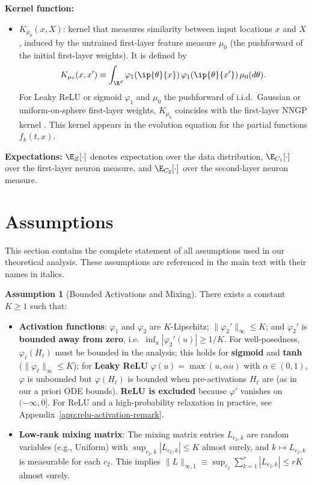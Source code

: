 \documentclass[nohyperref]{article}
\theoremstyle{plain}
\theoremstyle{definition}
\newtheorem{assumption}[theorem]{Assumption}
\theoremstyle{remark}
\begin{document}
\textbf{Kernel function:}
\begin{itemize}
\item $K_{\mu_0}(x,X)$: kernel that measures similarity between input locations $x$ and $X$, induced by the untrained first-layer feature measure $\mu_0$ (the pushforward of the initial first-layer weights). It is defined by
\[
K_{\mu_0}(x,x') \equiv \int_{\R^d}\varphi_1(\ip{\theta}{x})\,\varphi_1(\ip{\theta}{x'})\,\mu_0(d\theta).
\]
For Leaky ReLU or sigmoid $\varphi_1$ and $\mu_0$ the pushforward of i.i.d.\ Gaussian or uniform-on-sphere first-layer weights, $K_{\mu_0}$ coincides with the first-layer NNGP kernel \cite{jacot2018neural}. This kernel appears in the evolution equation for the partial functions $f_k(t,x)$.
\end{itemize}

\textbf{Expectations:} $\E_Z[\cdot]$ denotes expectation over the data distribution, $\E_{C_1}[\cdot]$ over the first-layer neuron measure, and $\E_{C_2}[\cdot]$ over the second-layer neuron measure.





\section{Assumptions}
\label{app:assumptions}

This section contains the complete statement of all assumptions used in our theoretical analysis. These assumptions are referenced in the main text with their names in italics.

\begin{assumption}[Bounded Activations and Mixing]
\label{assump:regularity}
There exists a constant $K\ge 1$ such that:
\begin{itemize}
\item \textbf{Activation functions}: $\varphi_1$ and $\varphi_2$ are $K$-Lipschitz; $\|\varphi_2'\|_\infty\le K$; and $\varphi_2'$ is \textbf{bounded away from zero}, i.e.\ $\inf_u |\varphi_2'(u)|\ge 1/K$. For well-posedness, $\varphi_\ell(H_\ell)$ must be bounded in the analysis; this holds for \textbf{sigmoid} and \textbf{tanh} ($\|\varphi_\ell\|_\infty\le K$); for \textbf{Leaky ReLU} $\varphi(u)=\max(u,\alpha u)$ with $\alpha\in(0,1)$, $\varphi$ is unbounded but $\varphi(H_\ell)$ is bounded when pre-activations $H_\ell$ are (as in our a priori ODE bounds). \textbf{ReLU is excluded} because $\varphi'$ vanishes on $(-\infty,0]$. For ReLU and a high-probability relaxation in practice, see Appendix~\ref{app:relu-activation-remark}.
\item \textbf{Low-rank mixing matrix}: The mixing matrix entries $L_{c_2,k}$ are random variables (e.g., Uniform) with $\sup_{c_2,k}|L_{c_2,k}|\le K$ almost surely, and $k\mapsto L_{c_2,k}$ is measurable for each $c_2$. This implies $\|L\|_{\infty,1}\equiv \sup_{c_2}\sum_{k=1}^r |L_{c_2,k}|\le rK$ almost surely.
\end{itemize}
\end{assumption}
\end{document}
